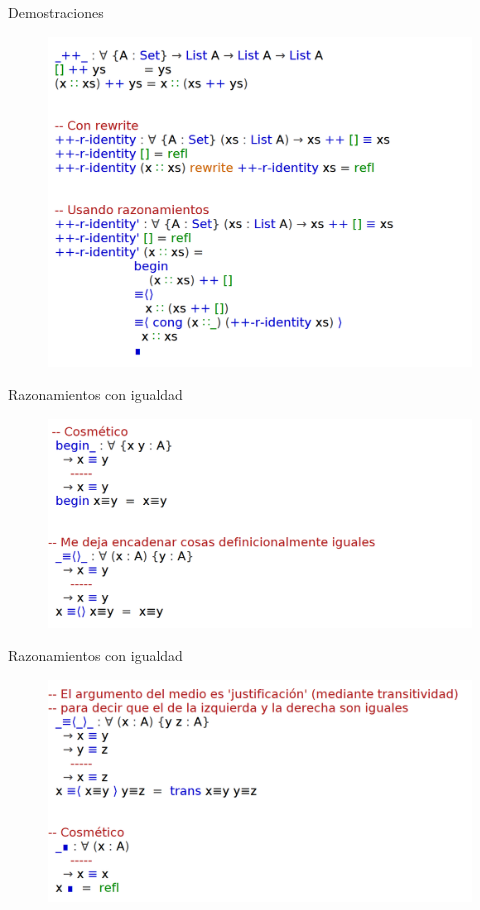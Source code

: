 \documentclass[11pt]{beamer}
\begin{document}
\begin{frame}{Demostraciones}
\begin{figure}
\includegraphics[scale=0.7]{img/reasoning02}
\end{figure}
\end{frame}

\begin{frame}{Razonamientos con igualdad}
\begin{figure}
\includegraphics[scale=0.7]{img/eq-reasoning}
\end{figure}
\end{frame}

\begin{frame}{Razonamientos con igualdad}
\begin{figure}
\includegraphics[scale=0.7]{img/eq-reasoning02}
\end{figure}
\end{frame}
\end{document}
